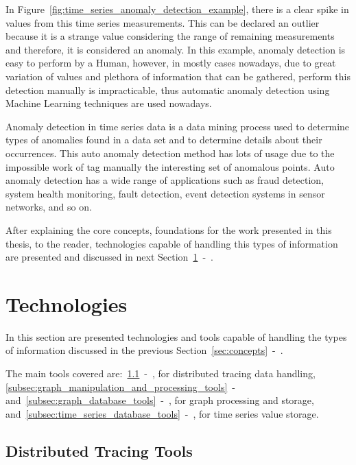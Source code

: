 In Figure~\ref{fig:time_series_anomaly_detection_example}, there is a clear spike in values from this time series measurements. This can be declared an outlier because it is a strange value considering the range of remaining measurements and therefore, it is considered an anomaly. In this example, anomaly detection is easy to perform by a Human, however, in mostly cases nowadays, due to great variation of values and plethora of information that can be gathered, perform this detection manually is impracticable, thus automatic anomaly detection using Machine Learning techniques are used nowadays.

Anomaly detection in time series data is a data mining process used to determine types of anomalies found in a data set and to determine details about their occurrences. This auto anomaly detection method has lots of usage due to the impossible work of tag manually the interesting set of anomalous points. Auto anomaly detection has a wide range of applications such as fraud detection, system health monitoring, fault detection, event detection systems in sensor networks, and so on.

After explaining the core concepts, foundations for the work presented in this thesis, to the reader, technologies capable of handling this types of information are presented and discussed in next Section~\ref{sec:technologies}~-~.

\section{Technologies}
\label{sec:technologies}

In this section are presented technologies and tools capable of handling the types of information discussed in the previous Section~\ref{sec:concepts}~-~.

The main tools covered are:~\ref{subsec:distributed_tracing_tools}~-~, for distributed tracing data handling, \ref{subsec:graph_manipulation_and_processing_tools}~-~ and~\ref{subsec:graph_database_tools}~-~, for graph processing and storage, and~\ref{subsec:time_series_database_tools}~-~, for time series value storage.

\subsection{Distributed Tracing Tools}
\label{subsec:distributed_tracing_tools}

